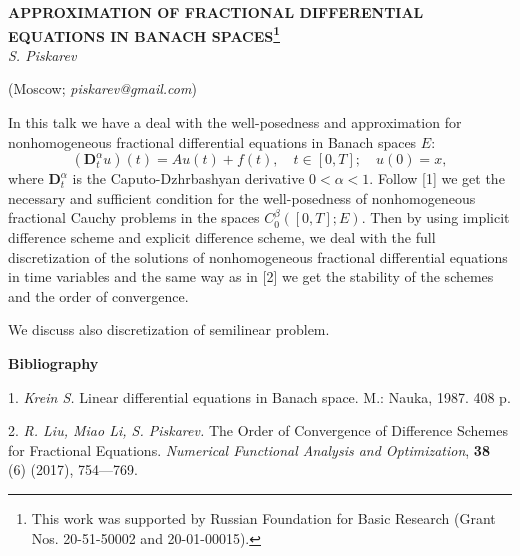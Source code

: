 
\begin{center}
    {\bf APPROXIMATION OF FRACTIONAL DIFFERENTIAL EQUATIONS IN BANACH SPACES\footnote{This work was supported by Russian Foundation for Basic Research
(Grant Nos. 20-51-50002 and  20-01-00015).}}\\

    {\it S. Piskarev}

    (Moscow; {\it piskarev@gmail.com})
\end{center}


In this talk we have a deal with the  well-posedness and approximation for nonhomogeneous
 fractional differential equations in Banach spaces $E$:
 $$ (\mathbf{D}_{t}^{\alpha} u)(t) = A u(t) + f (t), \quad t \in [0,T];\quad
u(0)=x, $$
where $\mathbf{D}_{t}^{\alpha}$ is the Caputo-Dzhrbashyan derivative $0 < \alpha < 1.$
Follow [1] we get the necessary and sufficient condition for the well-posedness of
nonhomogeneous fractional Cauchy problems in the spaces $C_0^\beta([0,T];E)$.
Then by using implicit difference scheme and explicit difference scheme, we
deal with the full discretization of the solutions of nonhomogeneous
fractional differential equations in time variables and the same way as in [2] we
get the  stability of the schemes and the order of convergence.

We discuss also discretization of semilinear problem.


\smallskip \centerline {\bf Bibliography} \nopagebreak

1. {\it Krein S.} Linear differential equations in Banach space. M.: Nauka, 1987. 408 p.

2. {\it R. Liu, Miao Li, S. Piskarev.} The Order of Convergence of Difference Schemes for
Fractional Equations. {\em Numerical Functional Analysis and Optimization}, {\bf 38} (6)
(2017), 754---769.



